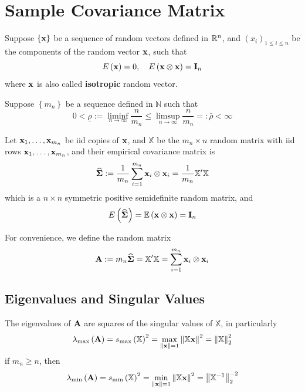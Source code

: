 \chapter{Sample Covariance Matrix}

Suppose \(\left\{\mathbf{x}\right\}\) be a sequence of random vectors defined in \(\mathbb{R}^{n}\), and \(\left(x_{i}\right)_{1\leq i\leq n}\) be the components of the random vector \(\mathbf{x}\), such that
\begin{equation*}
	E\left(\mathbf{x}\right)=0,\quad E\left(\mathbf{x}\otimes\mathbf{x}\right)=\mathbf{I}_{n}
\end{equation*}
where \(\mathbf{x}\) is also called \textbf{isotropic} random vector.

Suppose \(\left\{m_{n}\right\}\) be a sequence defined in \(\mathbb{N}\) such that
\begin{equation*}
	0<\underline{\rho}:=\liminf_{n\rightarrow\infty}\frac{n}{m_{n}}\leq\limsup_{n\rightarrow\infty}\frac{n}{m_{n}}=:\bar{\rho}<\infty
\end{equation*}

Let \(\mathbf{x}_{1},\ldots,\mathbf{x}_{m_{n}}\) be iid copies of \(\mathbf{x}\), and \(\mathbb{X}\) be the \(m_{n}\times n\) random matrix with iid rows \(\mathbf{x}_{1},\ldots,\mathbf{x}_{m_{n}}\), and their empirical covariance matrix is
\begin{equation*}
	\widehat{\boldsymbol{\Sigma}}:=\frac{1}{m_{n}}\sum_{i=1}^{m_{n}}\mathbf{x}_{i}\otimes\mathbf{x}_{i}=\frac{1}{m_{n}}\mathbb{X}^{\prime}\mathbb{X}
\end{equation*}
which is a \(n\times n\) symmetric positive semidefinite random matrix, and
\begin{equation*}
	E\left(\widehat{\boldsymbol{\Sigma}}\right)=\mathbb{E}\left(\mathbf{x}\otimes\mathbf{x}\right)=\mathbf{I}_{n}
\end{equation*}

For convenience, we define the random matrix
\begin{equation*}
	\mathbf{A}:=m_{n}\widehat{\boldsymbol{\Sigma}}=\mathbb{X}^{\prime}\mathbb{X}=\sum_{i=1}^{m_{n}}\mathbf{x}_{i}\otimes\mathbf{x}_{i}
\end{equation*}

\section{Eigenvalues and Singular Values}

\begin{theorem}
	The eigenvalues of \(\mathbf{A}\) are squares of the singular values of \(\mathbb{X}\), in particularly
	\begin{equation*}
		\lambda_{\max}\left(\mathbf{A}\right)=s_{\max}\left(\mathbb{X}\right)^{2}=\max_{\|\mathbf{x}\|=1}\left\|\mathbb{X}\mathbf{x}\right\|^{2}=\left\|\mathbb{X}\right\|_{2}^{2}
	\end{equation*}
	if \(m_{n}\geq n\), then
	\begin{equation*}
		\lambda_{\min}\left(\mathbf{A}\right)=s_{\min}\left(\mathbb{X}\right)^{2}=\min_{\|\mathbf{x}\|=1}\left\|\mathbb{X}\mathbf{x}\right\|^{2}=\left\|\mathbb{X}^{-1}\right\|_{2}^{-2}
	\end{equation*}
\end{theorem}

